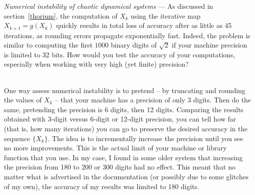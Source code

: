 \documentclass[oneside,10pt]{book}
\begin{document}
\begin{Exercise} \label{exensd}{\em Numerical instability of chaotic dynamical systems} --- As discussed in section~\ref{thorium}, the computation
 of $X_k$ using the iterative map $X_{k+1}=g(X_k)$ quickly results in total loss of accuracy after as little as 45 iterations, as rounding errors propagate exponentially fast. Indeed, the problem is similar to computing the first $1000$ binary digits of $\sqrt{2}$ if your machine precision is limited to 32 bits. How would you test the accuracy of your computations, especially when working with very high (yet finite) precision?
\vspace{1ex}

 \\
One way assess \textcolor{index}{numerical instability} is to pretend -- by truncating and rounding the values of $X_k$ -- that your machine has a precision of only 3 digits. Then do the same, pretending the precision is 6 digits, then 12 digits. Comparing the results obtained with 3-digit versus 6-digit or 12-digit precision, you can tell how far (that is, how many iterations) you can go to preserve the desired accuracy in the sequence $\{X_k\}$. The idea is to incrementally increase the precision until you see no more improvements. This is the actual limit of your machine or library function that you use. In my case, I found in some older system that increasing the precision from 180 to 200 or 300 digits had no effect. This meant that no matter what is advertised in the documentation (or possibly due to some glitches of my own), the accuracy of my results was limited to 180 digits.
\end{Exercise}
\end{document}

